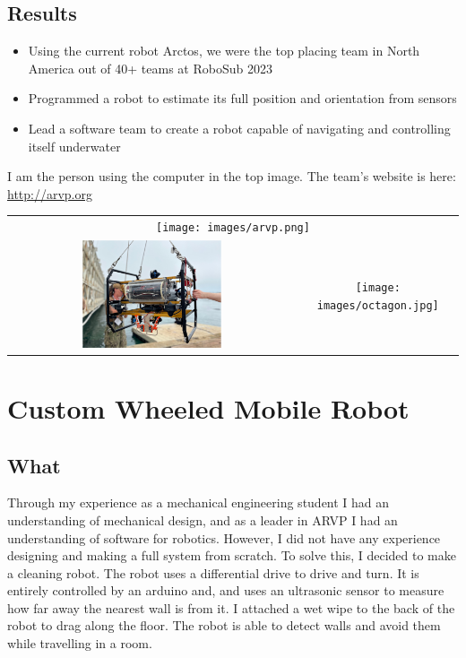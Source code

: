 \documentclass[11pt]{article}
\begin{document}
\subsection*{Results}
\begin{itemize}
    \item Using the current robot Arctos, we were the top placing team in North America out of 40+
    teams at RoboSub 2023
    \item Programmed a robot to estimate its full position and orientation from sensors
    \item Lead a software team to create a robot capable of navigating and controlling itself underwater
\end{itemize}

I am the person using the computer in the top image. The team's website is here: \url{http://arvp.org}

\vspace{-6mm}
\begin{center}
    \begin{tabular}{cc}
        \multicolumn{2}{c}{\texttt{[image: images/arvp.png]}}\\
        \includegraphics[width=0.5\textwidth, trim={0mm, 0mm, 0mm, 0mm}, clip]{images/arctos.png} & \texttt{[image: images/octagon.jpg]} \\
    \end{tabular}
\end{center}
\newpage

\section*{Custom Wheeled Mobile Robot}
\subsection*{What}
Through my experience as a mechanical engineering student I had an understanding of mechanical design, and as a leader in ARVP I had an understanding of software for robotics. However, I did not have any experience designing and making a full system from scratch. To solve this, I decided to make a cleaning robot. The robot uses a differential drive to drive and turn. It is entirely controlled by an arduino and, and uses an ultrasonic sensor to measure how far away the nearest wall is from it. I attached a wet wipe to the back of the robot to drag along the floor. The robot is able to detect walls and avoid them while travelling in a room. 
\end{document}
